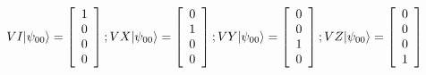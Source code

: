 \documentclass[12pt]{article}
\begin{document}
\begin{enumerate}
\begin{displaymath}
VI|\psi_{00} \rangle =
\left[ \begin{array}{c}
1\\
0\\
0\\
0
\end{array} \right];
VX|\psi_{00} \rangle =
\left[ \begin{array}{c}
0\\
1\\
0\\
0
\end{array} \right];
VY|\psi_{00} \rangle =
\left[ \begin{array}{c}
0\\
0\\
1\\
0
\end{array} \right];
VZ|\psi_{00} \rangle =
\left[ \begin{array}{c}
0\\
0\\
0\\
1
\end{array} \right]
\end{displaymath}

\end{enumerate}
\end{document}
